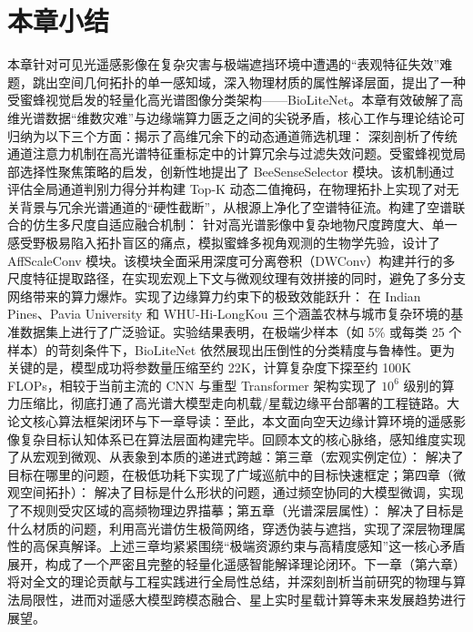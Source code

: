 \section{本章小结}
本章针对可见光遥感影像在复杂灾害与极端遮挡环境中遭遇的“表观特征失效”难题，跳出空间几何拓扑的单一感知域，深入物理材质的属性解译层面，提出了一种受蜜蜂视觉启发的轻量化高光谱图像分类架构——BioLiteNet。本章有效破解了高维光谱数据“维数灾难”与边缘端算力匮乏之间的尖锐矛盾，核心工作与理论结论可归纳为以下三个方面：揭示了高维冗余下的动态通道筛选机理： 深刻剖析了传统通道注意力机制在高光谱特征重标定中的计算冗余与过滤失效问题。受蜜蜂视觉局部选择性聚焦策略的启发，创新性地提出了 BeeSenseSelector 模块。该机制通过评估全局通道判别力得分并构建 Top-K 动态二值掩码，在物理拓扑上实现了对无关背景与冗余光谱通道的“硬性截断”，从根源上净化了空谱特征流。构建了空谱联合的仿生多尺度自适应融合机制： 针对高光谱影像中复杂地物尺度跨度大、单一感受野极易陷入拓扑盲区的痛点，模拟蜜蜂多视角观测的生物学先验，设计了 AffScaleConv 模块。该模块全面采用深度可分离卷积（DWConv）构建并行的多尺度特征提取路径，在实现宏观上下文与微观纹理有效拼接的同时，避免了多分支网络带来的算力爆炸。实现了边缘算力约束下的极致效能跃升： 在 Indian Pines、Pavia University 和 WHU-Hi-LongKou 三个涵盖农林与城市复杂环境的基准数据集上进行了广泛验证。实验结果表明，在极端少样本（如 5\% 或每类 25 个样本）的苛刻条件下，BioLiteNet 依然展现出压倒性的分类精度与鲁棒性。更为关键的是，模型成功将参数量压缩至约 22K，计算复杂度下探至约 100K FLOPs，相较于当前主流的 CNN 与重型 Transformer 架构实现了 $10^6$ 级别的算力压缩比，彻底打通了高光谱大模型走向机载/星载边缘平台部署的工程链路。大论文核心算法框架闭环与下一章导读：至此，本文面向空天边缘计算环境的遥感影像复杂目标认知体系已在算法层面构建完毕。回顾本文的核心脉络，感知维度实现了从宏观到微观、从表象到本质的递进式跨越：第三章（宏观实例定位）： 解决了目标在哪里的问题，在极低功耗下实现了广域巡航中的目标快速框定；第四章（微观空间拓扑）： 解决了目标是什么形状的问题，通过频空协同的大模型微调，实现了不规则受灾区域的高频物理边界描摹；第五章（光谱深层属性）： 解决了目标是什么材质的问题，利用高光谱仿生极简网络，穿透伪装与遮挡，实现了深层物理属性的高保真解译。上述三章均紧紧围绕“极端资源约束与高精度感知”这一核心矛盾展开，构成了一个严密且完整的轻量化遥感智能解译理论闭环。下一章（第六章）将对全文的理论贡献与工程实践进行全局性总结，并深刻剖析当前研究的物理与算法局限性，进而对遥感大模型跨模态融合、星上实时星载计算等未来发展趋势进行展望。


